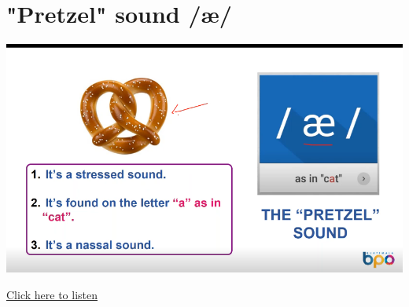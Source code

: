 \section{"Pretzel" sound \textipa/{\ae}/}
\begin{center}
\includegraphics[width=1\textwidth]{images/pretzel_portrait.png}
\end{center}

\href{https://drive.google.com/file/d/1hJGOQVApbcAGU1vvELpt-nEejQ8-av7o/view?usp=drive_link}{Click here to listen}

